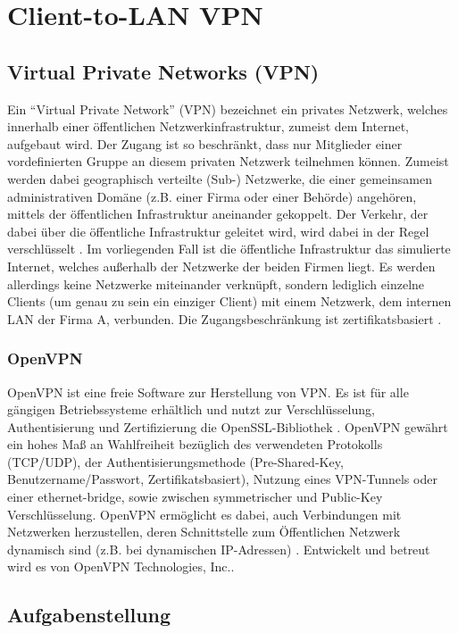 \chapter{Client-to-LAN VPN}

\section{Virtual Private Networks (VPN)}
Ein "`Virtual Private Network"' (VPN) bezeichnet ein privates Netzwerk, welches innerhalb einer öffentlichen Netzwerkinfrastruktur, zumeist dem Internet, aufgebaut wird. Der Zugang ist so beschränkt, dass nur Mitglieder einer vordefinierten Gruppe an diesem privaten Netzwerk teilnehmen können. Zumeist werden dabei geographisch verteilte (Sub-) Netzwerke, die einer gemeinsamen administrativen Domäne (z.B. einer Firma oder einer Behörde) angehören, mittels der öffentlichen Infrastruktur aneinander gekoppelt. Der Verkehr, der dabei über die öffentliche Infrastruktur geleitet wird, wird dabei in der Regel verschlüsselt \cite{Ferguson1998}. Im vorliegenden Fall ist die öffentliche Infrastruktur das simulierte Internet, welches außerhalb der Netzwerke der beiden Firmen liegt. Es werden allerdings keine Netzwerke miteinander verknüpft, sondern lediglich einzelne Clients (um genau zu sein ein einziger Client) mit einem Netzwerk, dem internen LAN der Firma A, verbunden. Die Zugangsbeschränkung ist zertifikatsbasiert \cite{Neuschwander2014}.

\subsection{OpenVPN}
OpenVPN ist eine freie Software zur Herstellung von VPN. Es ist für alle gängigen Betriebssysteme erhältlich und nutzt zur Verschlüsselung, Authentisierung und Zertifizierung die OpenSSL-Bibliothek \cite{OpenVPNeu}. OpenVPN gewährt ein hohes Maß an Wahlfreiheit bezüglich des verwendeten Protokolls (TCP/UDP), der Authentisierungsmethode (Pre-Shared-Key, Benutzername/Passwort, Zertifikatsbasiert), Nutzung eines VPN-Tunnels oder einer ethernet-bridge, sowie zwischen symmetrischer und Public-Key Verschlüsselung. OpenVPN ermöglicht es dabei, auch Verbindungen mit Netzwerken herzustellen, deren Schnittstelle zum Öffentlichen Netzwerk dynamisch sind (z.B. bei dynamischen IP-Adressen) \cite{wiOpenVPN}. Entwickelt und betreut wird es von OpenVPN Technologies, Inc..

\section{Aufgabenstellung}

